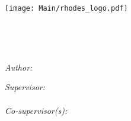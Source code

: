 \documentclass[
11pt, %
english, %
onehalfspacing, %
headsepline, %
]{RhodesThesis} %
\author{Brian \textsc{Welman}} %
\theoremstyle{customdefstyle}
\begin{document}
\frontmatter %

\pagestyle{plain} %


\begin{titlepage}
  \begin{center}

    \vspace*{.06\textheight}
    \texttt{[image: Main/rhodes\_logo.pdf]}
    \vspace*{.06\textheight}

    \HRule \\[0.4cm] %
    {\LARGE \bfseries \ttitle\par}\vspace{0.4cm} %
    \HRule \\[1cm] %

    \begin{minipage}[t]{0.3\textwidth}
      \begin{flushleft} \large
        \emph{Author:}\\
        {\authorname} %
      \end{flushleft}
    \end{minipage}
    \begin{minipage}[t]{0.6\textwidth}
      \begin{flushright} \large
        \emph{Supervisor:} \\
        {\supname} \\
        \emph{Co-supervisor(s):} \\
        \cosupname %
      \end{flushright}
    \end{minipage}\\[1cm]



\end{center}
\end{titlepage}
\end{document}
